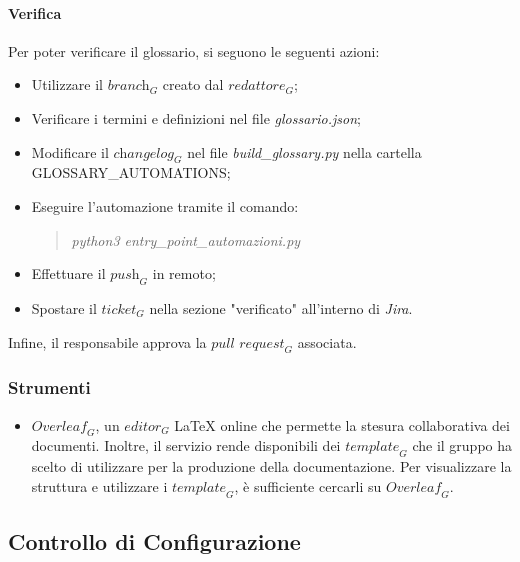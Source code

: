 \paragraph{Verifica} Per poter verificare il glossario, si seguono le seguenti azioni:
\begin{itemize}
    \item Utilizzare il $\textit{branch}_G$ creato dal $\textit{redattore}_G$;
    \item Verificare i termini e definizioni nel file \emph{glossario.json};
    \item Modificare il $\textit{changelog}_G$ nel file \emph{build\_glossary.py} nella cartella GLOSSARY\_AUTOMATIONS;
    \item Eseguire l'automazione tramite il comando:
        \begin{quote}
            \emph{  python3 entry\_point\_automazioni.py} 
        \end{quote}
    \item Effettuare il $\textit{push}_G$ in remoto;
    \item Spostare il $\textit{ticket}_G$ nella sezione "verificato" all'interno di \emph{Jira}.
\end{itemize}
Infine, il responsabile approva la $\textit{pull request}_G$ associata.

\subsubsection{Strumenti}
\begin{itemize}
\item \emph{\textbf{$\textit{Overleaf}_G$}}, un $\textit{editor}_G$ LaTeX online che permette la stesura collaborativa dei documenti. Inoltre, il servizio rende disponibili dei $\textit{template}_G$ che il gruppo ha scelto di utilizzare per la produzione della documentazione. Per visualizzare la struttura e utilizzare i $\textit{template}_G$, è sufficiente cercarli su $\textit{Overleaf}_G$. 
\end{itemize}

\subsection{Controllo di Configurazione}

